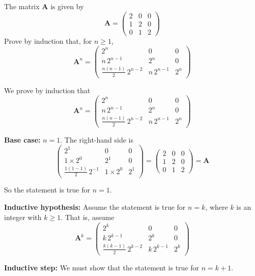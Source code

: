 \documentclass[leqno]{article}
\begin{document}
\begin{enumerate}[
  label=\textbf{\arabic*.},
  leftmargin=*,
  topsep=0pt,
  partopsep=0pt,
  parsep=0pt
]
The matrix $\mathbf{A}$ is given by
\[
\mathbf{A} = \begin{pmatrix} 2 & 0 & 0 \\ 1 & 2 & 0 \\ 0 & 1 & 2 \end{pmatrix}
\]
Prove by induction that, for $n \geq 1$,
\[
\renewcommand{\arraystretch}{1.2}
\mathbf{A}^n = \begin{pmatrix} 2^n & 0 & 0 \\ n\,2^{n-1} & 2^n & 0 \\ \frac{n(n-1)}{2}\,2^{n-2} & n\,2^{n-1} & 2^n \end{pmatrix}
\]

\vspace*{10pt}

\begin{djsSolution}
We prove by induction that
\[
\mathbf{A}^n=
\begin{pmatrix}
2^n & 0 & 0\\
n\,2^{n-1} & 2^n & 0\\
\frac{n(n-1)}{2}\,2^{n-2} & n\,2^{n-1} & 2^n
\end{pmatrix}
\]

\textbf{Base case:} \(n=1\). The right-hand side is
\[
\begin{pmatrix}
2^1 & 0 & 0\\
1\times 2^0 & 2^1 & 0\\
\frac{1(1-1)}{2}\,2^{-1} & 1\times 2^0 & 2^1
\end{pmatrix}
=
\begin{pmatrix}
2 & 0 & 0\\
1 & 2 & 0\\
0 & 1 & 2
\end{pmatrix}
= \mathbf{A}
\]

So the statement is true for \(n=1\).

\textbf{Inductive hypothesis:} Assume the statement is true for \(n=k\), where \(k\) is an integer with \(k\geq 1\). That is, assume
\[
\mathbf{A}^k=
\begin{pmatrix}
2^k & 0 & 0\\
k\,2^{k-1} & 2^k & 0\\
\frac{k(k-1)}{2}\,2^{k-2} & k\,2^{k-1} & 2^k
\end{pmatrix}
\]

\textbf{Inductive step:} We must show that the statement is true for \(n=k+1\).


\end{djsSolution}
\end{enumerate}
\end{document}
